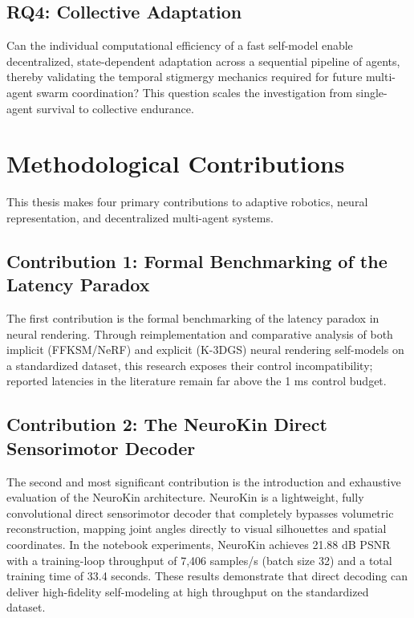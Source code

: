 \documentclass[12pt,a4paper,oneside]{report}
\begin{document}
\subsection{RQ4: Collective Adaptation}

Can the individual computational efficiency of a fast self-model enable decentralized, state-dependent adaptation across a sequential pipeline of agents, thereby validating the temporal stigmergy mechanics required for future multi-agent swarm coordination? This question scales the investigation from single-agent survival to collective endurance.

\section{Methodological Contributions}

This thesis makes four primary contributions to adaptive robotics, neural representation, and decentralized multi-agent systems.

\subsection{Contribution 1: Formal Benchmarking of the Latency Paradox}

The first contribution is the formal benchmarking of the latency paradox in neural rendering. Through reimplementation and comparative analysis of both implicit (FFKSM/NeRF) and explicit (K-3DGS) neural rendering self-models on a standardized dataset, this research exposes their control incompatibility; reported latencies in the literature remain far above the 1 ms control budget.

\subsection{Contribution 2: The NeuroKin Direct Sensorimotor Decoder}

The second and most significant contribution is the introduction and exhaustive evaluation of the NeuroKin architecture. NeuroKin is a lightweight, fully convolutional direct sensorimotor decoder that completely bypasses volumetric reconstruction, mapping joint angles directly to visual silhouettes and spatial coordinates. In the notebook experiments, NeuroKin achieves 21.88 dB PSNR with a training-loop throughput of 7,406 samples/s (batch size 32) and a total training time of 33.4 seconds. These results demonstrate that direct decoding can deliver high-fidelity self-modeling at high throughput on the standardized dataset.
\end{document}
